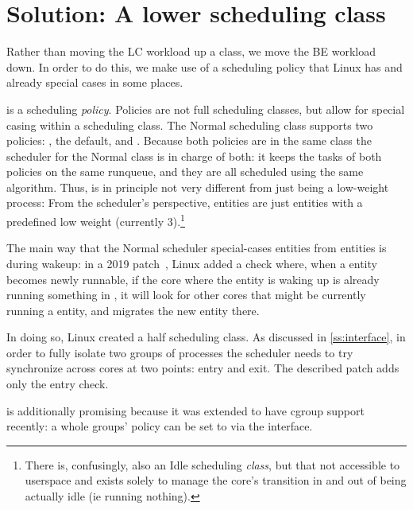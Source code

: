 
\section{Solution: A lower scheduling class}\label{s:idle}

Rather than moving the LC workload up a class, we move the BE workload down. In
order to do this, we make use of a scheduling policy that Linux has and already
special cases in some places.

\schedidle{} is a scheduling \textit{policy}. Policies are not full scheduling
classes, but allow for special casing within a scheduling class. The Normal
scheduling class supports two policies: \schednormal{}, the default, and
\schedidle{}. Because both policies are in the same class the scheduler for the
Normal class is in charge of both: it keeps the tasks of both policies on the
same runqueue, and they are all scheduled using the same algorithm. Thus,
\schedidle{} is in principle not very different from just being a low-weight
process: From the scheduler's perspective, \schedidle{} entities are just
entities with a predefined low weight (currently 3).\footnote{There is,
confusingly, also an Idle scheduling \textit{class}, but that not accessible to
userspace and exists solely to manage the core's transition in and out of being
actually idle (ie running nothing).}

The main way that the Normal scheduler special-cases \schedidle{} entities from
\schednormal{} entities is during wakeup: in a 2019 patch~\cite{TODO}, Linux
added a check where, when a \schednormal{} entity becomes newly runnable, if the
core where the entity is waking up is already running something in
\schednormal{}, it will look for other cores that might be currently running a
\schedidle{} entity, and migrates the new entity there.

In doing so, Linux created a half scheduling class. As discussed in
\autoref{ss:interface}, in order to fully isolate two groups of processes the
scheduler needs to try synchronize across cores at two points: entry and exit.
The described patch adds only the entry check.

\schedidle{} is additionally promising because it was extended to have cgroup
support recently\cite{TODO}: a whole groups' policy can be set to \schedidle{}
via the \cgroups{} interface.

